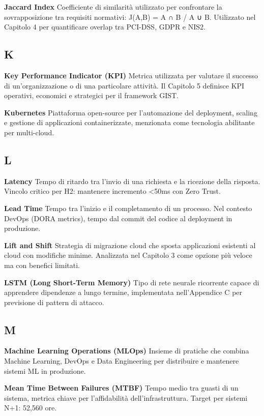 \documentclass{report}
\begin{document}
\textbf{Jaccard Index} Coefficiente di similarità utilizzato per
confrontare la sovrapposizione tra requisiti normativi: J(A,B) =
\textbar A ∩ B\textbar{} / \textbar A ∪ B\textbar. Utilizzato nel
Capitolo 4 per quantificare overlap tra PCI-DSS, GDPR e NIS2.

\subsection{K}\label{k}

\textbf{Key Performance Indicator (KPI)} Metrica utilizzata per valutare
il successo di un'organizzazione o di una particolare attività. Il
Capitolo 5 definisce KPI operativi, economici e strategici per il
framework GIST.

\textbf{Kubernetes} Piattaforma open-source per l'automazione del
deployment, scaling e gestione di applicazioni containerizzate,
menzionata come tecnologia abilitante per multi-cloud.

\subsection{L}\label{l}

\textbf{Latency} Tempo di ritardo tra l'invio di una richiesta e la
ricezione della risposta. Vincolo critico per H2: mantenere incremento
\textless50ms con Zero Trust.

\textbf{Lead Time} Tempo tra l'inizio e il completamento di un processo.
Nel contesto DevOps (DORA metrics), tempo dal commit del codice al
deployment in produzione.

\textbf{Lift and Shift} Strategia di migrazione cloud che sposta
applicazioni esistenti al cloud con modifiche minime. Analizzata nel
Capitolo 3 come opzione più veloce ma con benefici limitati.

\textbf{LSTM (Long Short-Term Memory)} Tipo di rete neurale ricorrente
capace di apprendere dipendenze a lungo termine, implementata
nell'Appendice C per previsione di pattern di attacco.

\subsection{M}\label{m}

\textbf{Machine Learning Operations (MLOps)} Insieme di pratiche che
combina Machine Learning, DevOps e Data Engineering per distribuire e
mantenere sistemi ML in produzione.

\textbf{Mean Time Between Failures (MTBF)} Tempo medio tra guasti di un
sistema, metrica chiave per l'affidabilità dell'infrastruttura. Target
per sistemi N+1: 52,560 ore.
\end{document}
